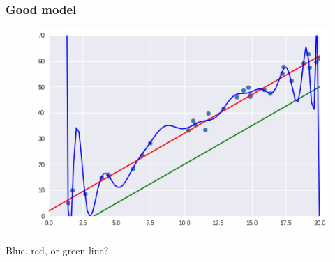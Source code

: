 \documentclass[]{beamer}
\begin{document}
\begin{frame}
	\frametitle{Good model}
	\begin{figure}
		\includegraphics[scale=.4]{imgs/linreg_2.png}
	\end{figure}
	\begin{center}
		Blue, red, or green line?
	\end{center}
\end{frame}
\end{document}
